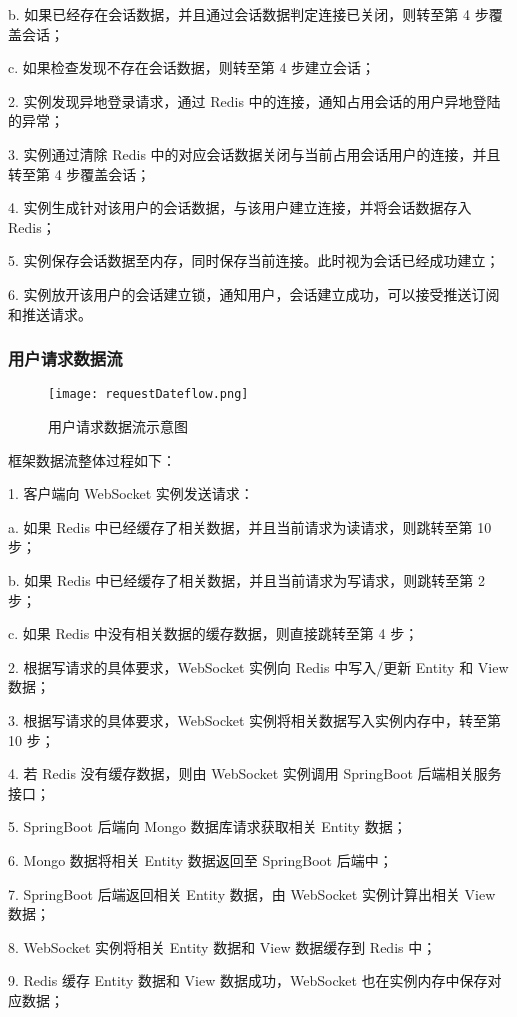 \quad{}\quad{}b. 如果已经存在会话数据，并且通过会话数据判定连接已关闭，则转至第 4 步覆盖会话；

\quad{}\quad{}c. 如果检查发现不存在会话数据，则转至第 4 步建立会话；

2. 实例发现异地登录请求，通过 Redis 中的连接，通知占用会话的用户异地登陆的异常；

3. 实例通过清除 Redis 中的对应会话数据关闭与当前占用会话用户的连接，并且转至第 4 步覆盖会话；

4. 实例生成针对该用户的会话数据，与该用户建立连接，并将会话数据存入 Redis；

5. 实例保存会话数据至内存，同时保存当前连接。此时视为会话已经成功建立；

6. 实例放开该用户的会话建立锁，通知用户，会话建立成功，可以接受推送订阅和推送请求。
\subsubsection{用户请求数据流}
\begin{figure}[!htp]
  \centering
  \texttt{[image: requestDateflow.png]}
  \caption[请求数据流]
    {用户请求数据流示意图}
 \label{fig:requestDateflow}
\end{figure}
框架数据流整体过程如下：

1. 客户端向 WebSocket 实例发送请求：

\quad{}\quad{}a. 如果 Redis 中已经缓存了相关数据，并且当前请求为读请求，则跳转至第 10 步；

\quad{}\quad{}b. 如果 Redis 中已经缓存了相关数据，并且当前请求为写请求，则跳转至第 2 步；

\quad{}\quad{}c. 如果 Redis 中没有相关数据的缓存数据，则直接跳转至第 4 步；

2. 根据写请求的具体要求，WebSocket 实例向 Redis 中写入/更新 Entity 和 View数据；

3. 根据写请求的具体要求，WebSocket 实例将相关数据写入实例内存中，转至第 10 步；

4. 若 Redis 没有缓存数据，则由 WebSocket 实例调用 SpringBoot 后端相关服务接口；

5. SpringBoot 后端向 Mongo 数据库请求获取相关 Entity 数据；

6. Mongo 数据将相关 Entity 数据返回至 SpringBoot 后端中；

7. SpringBoot 后端返回相关 Entity 数据，由 WebSocket 实例计算出相关 View 数据；

8. WebSocket 实例将相关 Entity 数据和 View 数据缓存到 Redis 中；

9. Redis 缓存 Entity 数据和 View 数据成功，WebSocket 也在实例内存中保存对应数据；

